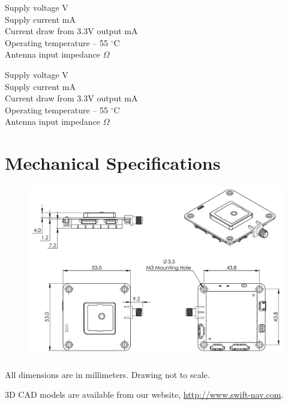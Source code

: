 \documentclass{article}
\begin{document}
\begin{multicols}{2}

\noindent
Supply voltage  V \\
Supply current  mA \\
Current draw from 3.3V output  mA \\
Operating temperature  -- 55 $^\circ$C \\
Antenna input impedance  $\Omega$

\noindent
Supply voltage  V \\
Supply current  mA \\
Current draw from 3.3V output  mA \\
Operating temperature  -- 55 $^\circ$C \\
Antenna input impedance  $\Omega$

\end{multicols}

\section*{Mechanical Specifications}
\begin{figure}[h]
  \centering
  \includegraphics[scale=0.75]{swiftnav_v2_2_mechanical.pdf}
\end{figure}

All dimensions are in millimeters. Drawing not to scale.

3D CAD models are available from our website, \url{http://www.swift-nav.com}.
\end{document}
